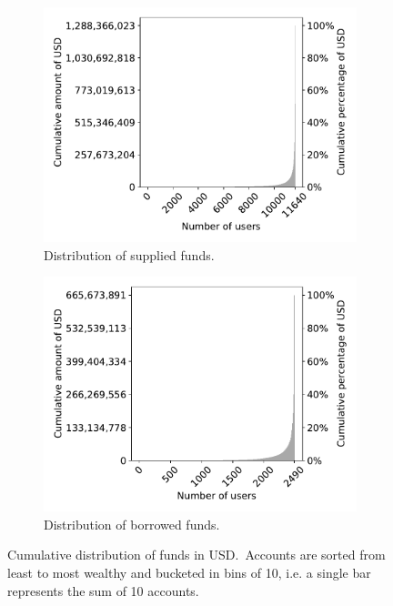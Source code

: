\begin{figure}[tbp]
	\begin{subfigure}{.5\textwidth}
		\centering
		\includegraphics[width=\textwidth]{./5b-economic-security/figures/suppliers-distribution.pdf}
		\caption{Distribution of supplied funds.}
		\label{fig:suppliers-distribution}
	\end{subfigure}
	\begin{subfigure}{.5\textwidth}
		\centering
		\includegraphics[width=\textwidth]{./5b-economic-security/figures/borrowers-distribution.pdf}
		\caption{Distribution of borrowed funds.}
		\label{fig:borrowers-distribution}
	\end{subfigure}
	\caption[Cumulative distribution of funds in USD on Compound]{Cumulative distribution of funds in USD.~Accounts are sorted from least to most wealthy and bucketed in bins of 10, i.e. a single bar represents the sum of 10 accounts.}\label{fig:suppliers-borrowers-distribution}
\end{figure}


